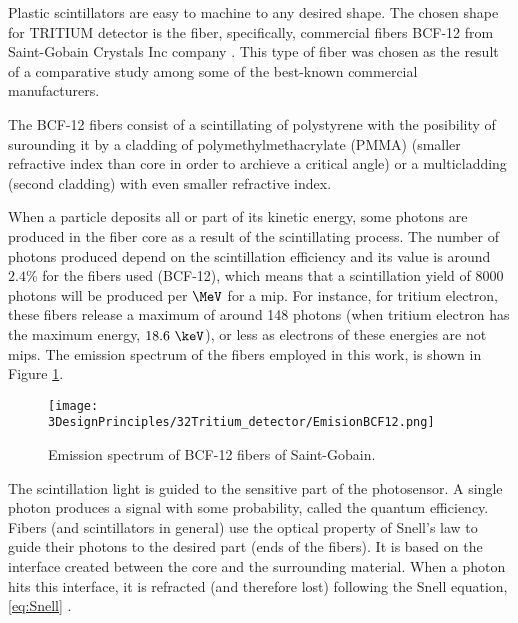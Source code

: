 Plastic scintillators are easy to machine to any desired shape. The chosen shape for TRITIUM detector is the fiber, specifically, commercial fibers BCF-12 from Saint-Gobain Crystals Inc company \cite{DataSheetBCF12Fiber}. This type of fiber was chosen as the result of a comparative study \cite{TFGAlberto} among some of the best-known commercial manufacturers. 


The BCF-12 fibers consist of a scintillating of polystyrene with the posibility of surounding it by a cladding of polymethylmethacrylate (PMMA) (smaller refractive index than core in order to archieve a critical angle) or a multicladding (second cladding) with even smaller refractive index.

When a particle deposits all or part of its kinetic energy, some photons are produced in the fiber core as a result of the scintillating process. The number of photons produced depend on the scintillation efficiency and its value is around $2.4\%$ for the fibers used (BCF-12), which means that a scintillation yield of $8000$ photons will be produced per $\MeV$ for a mip. For instance, for tritium electron, these fibers release a maximum of around 148 photons (when tritium electron has the maximum energy, $18.6~\keV$), or less as electrons of these energies are not mips. The emission spectrum of the fibers employed in this work, is shown in Figure \ref{fig:EmissionSpectrumFibers}.

\begin{figure}[htbp]
\centering
\texttt{[image: 3DesignPrinciples/32Tritium\_detector/EmisionBCF12.png]}
\caption{Emission spectrum of BCF-12 fibers of Saint-Gobain.\label{fig:EmissionSpectrumFibers}~\cite{DataSheetBCF12Fiber}}
\end{figure}

The scintillation light is guided to the sensitive part of the photosensor. A single photon produces a signal with some probability, called the quantum efficiency. Fibers (and scintillators in general) use the optical property of Snell's law \cite{Snell} to guide their photons to the desired part (ends of the fibers). It is based on the interface created between the core and the surrounding material. When a photon hits this interface, it is refracted (and therefore lost) following the Snell equation, \ref{eq:Snell} \cite{Snell}. 

